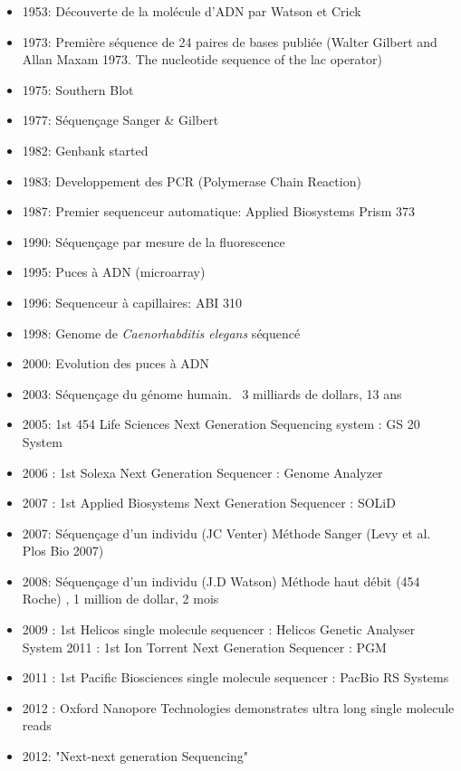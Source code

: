 \documentclass[a4paper]{article}
\begin{document}
\begin{itemize}
\item 1953: Découverte de la molécule d'ADN par Watson et Crick
\item 1973: Première séquence de 24 paires de bases publiée (Walter Gilbert and Allan Maxam 1973. The nucleotide sequence of the lac operator)
\item 1975: Southern Blot
\item 1977: Séquençage Sanger & Gilbert
\item 1982: Genbank started
\item 1983: Developpement des PCR (Polymerase Chain Reaction)
\item 1987: Premier sequenceur automatique: Applied Biosystems Prism 373
\item 1990: Séquençage par mesure de la fluorescence
\item 1995: Puces à ADN (microarray)
\item 1996: Sequenceur à capillaires: ABI 310
\item 1998: Genome de \textit{Caenorhabditis elegans} séquencé
\item 2000: Evolution des puces à ADN
\item 2003: Séquençage du génome humain. ~3 milliards de dollars, 13 ans 
\item 2005: 1st 454 Life Sciences Next Generation Sequencing system : GS 20 System
\item 2006 : 1st Solexa Next Generation Sequencer : Genome Analyzer
\item 2007 : 1st Applied Biosystems Next Generation Sequencer : SOLiD
\item 2007: Séquençage d'un individu (JC Venter) Méthode Sanger (Levy et al. Plos Bio 2007)
\item 2008: Séquençage d'un individu (J.D Watson) Méthode haut débit (454 Roche) \cite{wheeler2008complete}, 1 million de dollar, 2 mois
\item 2009 : 1st Helicos single molecule sequencer : Helicos Genetic Analyser System 2011 : 1st Ion Torrent Next Generation Sequencer : PGM
\item 2011 : 1st Pacific Biosciences single molecule sequencer : PacBio RS Systems
\item 2012 : Oxford Nanopore Technologies demonstrates ultra long single molecule reads
\item 2012: "Next-next generation Sequencing"
\end{itemize}
\end{document}
